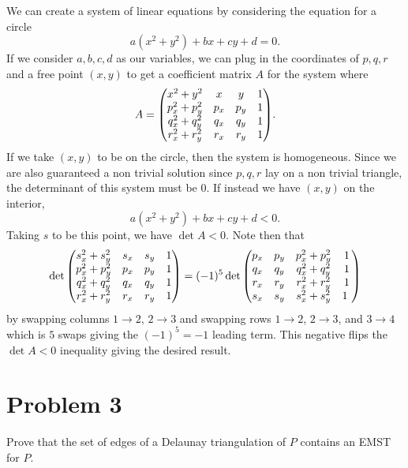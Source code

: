 \documentclass[12pt]{extarticle}
\begin{document}
\begin{solution}
    We can create a system of linear equations by considering the equation for a circle
    \[
        a(x^2 + y^2) + bx + cy + d = 0
    .\]
    If we consider $a,b,c,d$ as our variables, we can plug in the coordinates of $p,q,r$ and a free point $(x,y)$ to get a coefficient matrix $A$ for the system where
    \[
        A = \mqty(
        x^2 + y^2 & x & y & 1 \\
        p_x^2 + p_y^2 & p_x & p_y & 1 \\
        q_x^2 + q_y^2 & q_x & q_y & 1 \\
        r_x^2 + r_y^2 & r_x & r_y & 1 \\
        )
    .\]
    If we take $(x,y)$ to be on the circle, then the system is homogeneous. Since we are also guaranteed a non trivial solution since $p,q,r$ lay on a non trivial triangle, the determinant of this system must be $0$. If instead we have $(x,y)$ on the interior,
    \[
        a(x^2 + y^2) + bx + cy + d < 0
    .\]
    Taking $s$ to be this point, we have $\det A < 0$. Note then that
    \[
        \det\mqty(
        s_x^2 + s_y^2 & s_x & s_y & 1 \\
        p_x^2 + p_y^2 & p_x & p_y & 1 \\
        q_x^2 + q_y^2 & q_x & q_y & 1 \\
        r_x^2 + r_y^2 & r_x & r_y & 1 \\
        ) = (-1)^5 \det\mqty(
        p_x & p_y &p_x^2 + p_y^2 & 1 \\
        q_x & q_y &q_x^2 + q_y^2 & 1 \\
        r_x & r_y &r_x^2 + r_y^2 & 1 \\
        s_x & s_y & s_x^2 + s_y^2 & 1\
        )
    \]
    by swapping columns $1 \to 2$, $2\to 3$ and swapping rows $1 \to 2$, $2 \to 3$, and $3 \to 4$ which is $5$ swaps giving the $(-1)^5 = -1$ leading term. This negative flips the $\det A < 0$ inequality giving the desired result.
\end{solution}

\section*{Problem 3}
Prove that the set of edges of a Delaunay triangulation of $P$ contains an EMST for $P$.
\end{document}
